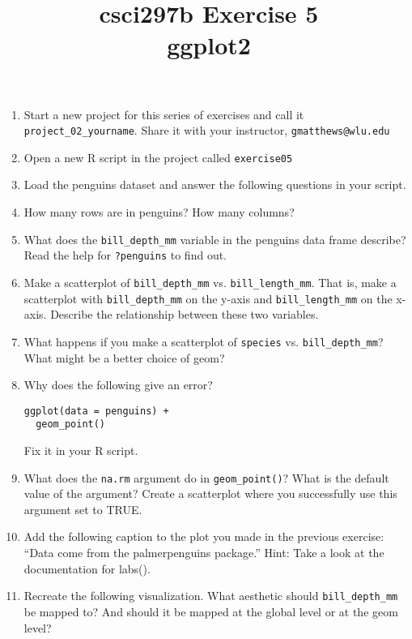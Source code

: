 \documentclass[12pt]{article}
\title{csci297b Exercise 5\\ggplot2
  }
\date{}
\begin{document}
\maketitle

\begin{enumerate}

\item Start a new project for this series of exercises and call it 
\verb|project_02_yourname|.  Share it with your
instructor, \verb|gmatthews@wlu.edu|


\item Open a new R script in the project called \verb|exercise05|

\item Load the penguins dataset and answer the following questions
in your script.

\item How many rows are in penguins? How many columns?

\item
What does the \verb|bill_depth_mm| variable in the penguins data frame describe? Read the help for \verb|?penguins| to find out.

\item 
Make a scatterplot of \verb|bill_depth_mm| vs. \verb|bill_length_mm|. That is, make a scatterplot with \verb|bill_depth_mm| on the y-axis and \verb|bill_length_mm| on the x-axis. Describe the relationship between these two variables.

\item
What happens if you make a scatterplot of \verb|species| vs. \verb|bill_depth_mm|? What might be a better choice of geom?

\item
Why does the following give an error?
\begin{verbatim}
ggplot(data = penguins) + 
  geom_point()
\end{verbatim}
Fix it in your R script.

\item
What does the \verb|na.rm| argument do in \verb|geom_point()|? What is the default value of the argument? Create a scatterplot where you successfully use this argument set to TRUE.

\item
Add the following caption to the plot you made in the previous exercise: “Data come from the palmerpenguins package.” Hint: Take a look at the documentation for labs().

\item
Recreate the following visualization. What aesthetic should \verb|bill_depth_mm| be mapped to? And should it be mapped at the global level or at the geom level?


\end{enumerate}
\end{document}
